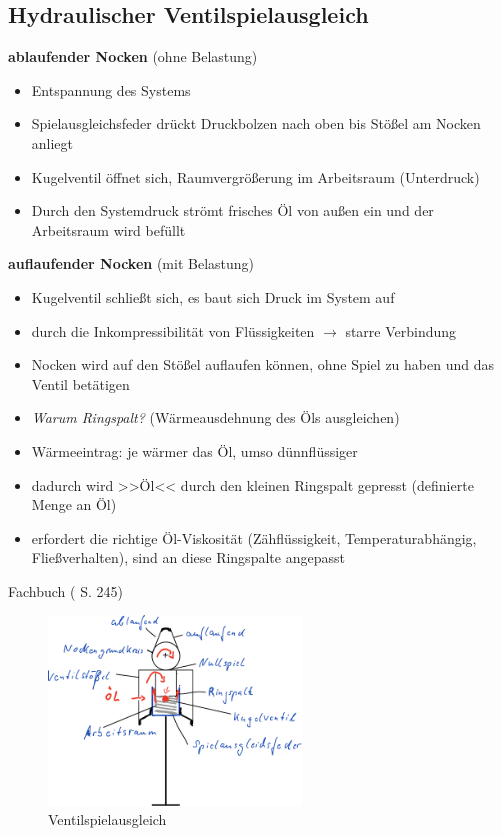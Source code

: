 \subsection{Hydraulischer
Ventilspielausgleich}\label{hydraulischer-ventilspielausgleich}

\textbf{ablaufender Nocken} (ohne Belastung)

\begin{itemize}
\item
  Entspannung des Systems
\item
  Spielausgleichsfeder drückt Druckbolzen nach oben bis Stößel am Nocken
  anliegt
\item
  Kugelventil öffnet sich, Raumvergrößerung im Arbeitsraum (Unterdruck)
\item
  Durch den Systemdruck strömt frisches Öl von außen ein und der
  Arbeitsraum wird befüllt
\end{itemize}

\textbf{auflaufender Nocken} (mit Belastung)

\begin{itemize}
\item
  Kugelventil schließt sich, es baut sich Druck im System auf
\item
  durch die Inkompressibilität von Flüssigkeiten $\to$ starre
  Verbindung
\item
  Nocken wird auf den Stößel auflaufen können, ohne Spiel zu haben und
  das Ventil betätigen
\item
  \emph{Warum Ringspalt?} (Wärmeausdehnung des Öls ausgleichen)
\item
  Wärmeeintrag: je wärmer das Öl, umso dünnflüssiger
\item
  dadurch wird >>Öl<< durch den kleinen Ringspalt gepresst (definierte
  Menge an Öl)
\item
  erfordert die richtige Öl-Viskosität (Zähflüssigkeit,
  Temperaturabhängig, Fließverhalten), sind an diese Ringspalte
  angepasst
\end{itemize}

Fachbuch (\textcite{brand:2020:fachkundeKfz} S. 245)

\begin{figure}[!ht]%
\centering
\includegraphics[width=0.6\textwidth]{images/Skizze/04_Ventilspielausgleich_Skizze.pdf}
\caption{Ventilspielausgleich}
\end{figure}

